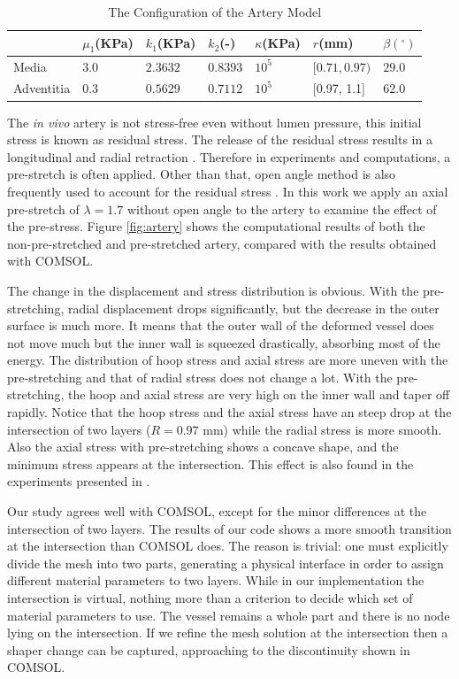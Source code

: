 \begin{table}[H]
\centering
\caption{The Configuration of the Artery Model}
\label{table:artery}
\begin{tabular}{ l l l l l l l}
\hline
& $\mu_1$(KPa) & $k_1$(KPa) & $k_2$(-) & $\kappa$(KPa) & $r$(mm) & $\beta(^\circ)$ \\
 \hline
 Media &   $3.0$ & $2.3632$ & $0.8393$ & $10^5$ & $[0.71, 0.97)$ & $29.0$\\
 Adventitia & $0.3$ & $0.5629$ & $0.7112$ & $10^5$ & [0.97, 1.1] & $62.0$\\
 \hline
\end{tabular}
\end{table}

The \emph{in vivo} artery is not stress-free even without lumen pressure, this initial stress is known as residual stress. The release of the residual stress results in a longitudinal and radial retraction \cite{Fung4, Holzapfel3}. Therefore in experiments and computations, a pre-stretch is often applied. Other than that, open angle method is also frequently used to account for the residual stress \cite{Kassab, Finet}. In this work we apply an axial pre-stretch of $\lambda = 1.7$ without open angle to the artery to examine the effect of the pre-stress. Figure \ref{fig:artery} shows the computational results of both the non-pre-stretched and pre-stretched artery, compared with the results obtained with COMSOL. 

The change in the displacement and stress distribution is obvious. With the pre-stretching, radial displacement drops significantly, but the decrease in the outer surface is much more. It means that the outer wall of the deformed vessel does not move much but the inner wall is squeezed drastically, absorbing most of the energy. The distribution of hoop stress and axial stress are more uneven with the pre-stretching and that of radial stress does not change a lot. With the pre-stretching, the hoop and axial stress are very high on the inner wall and taper off rapidly. Notice that the hoop stress and the axial stress have an steep drop at the intersection of two layers ($R = 0.97$ mm) while the radial stress is more smooth. Also the axial stress with pre-stretching shows a concave shape, and the minimum stress appears at the intersection. This effect is also found in the experiments presented in \cite{Keitzer}.

Our study agrees well with COMSOL, except for the minor differences at the intersection of two layers. The results of our code shows a more smooth transition at the intersection than COMSOL does. The reason is trivial: one must explicitly divide the mesh into two parts, generating a physical interface in order to assign different material parameters to two layers. While in our implementation the intersection is virtual, nothing more than a criterion to decide which set of material parameters to use. The vessel remains a whole part and there is no node lying on the intersection. If we refine the mesh solution at the intersection then a shaper change can be captured, approaching to the discontinuity shown in COMSOL.

